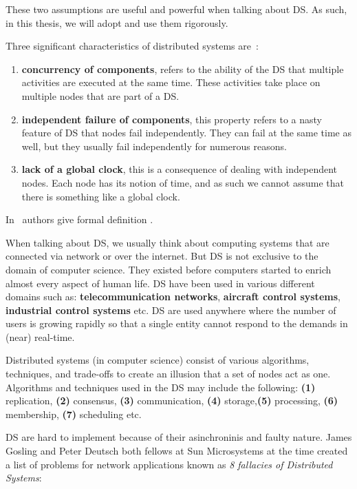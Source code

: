 \noindent
These two assumptions are useful and powerful when talking about DS. As such, in this thesis, we will adopt and use them rigorously.

Three significant characteristics of distributed systems are~\cite{0019513}: 

\begin{enumerate}[start=1,label={(\bfseries \arabic*)}]
	\item \textbf{concurrency of components}, refers to the ability of the DS that multiple activities are executed at the same time. These activities take place on multiple nodes that are part of a DS.
	\item \textbf{independent failure of components}, this property refers to a nasty feature of DS that nodes fail independently. They can fail at the same time as well, but they usually fail independently for numerous reasons.
	\item \textbf{lack of a global clock}, this is a consequence of dealing with independent nodes. Each node has its notion of time, and as such we cannot assume that there is something like a global clock.
\end{enumerate} 

\noindent
In~\cite{SteenT16} authors give formal definition .

When talking about DS, we usually think about computing systems that are connected via network or over the internet. But DS is not exclusive to the domain of computer science. They existed before computers started to enrich almost every aspect of human life. DS have been used in various different domains such as: \textbf{telecommunication networks}, \textbf{aircraft control systems}, \textbf{industrial control systems} etc. DS are used anywhere where the number of users is growing rapidly so that a single entity cannot respond to the demands in (near) real-time.

Distributed systems (in computer science) consist of various algorithms, techniques, and trade-offs to create an illusion that a set of nodes act as one. Algorithms and techniques used in the DS may include the following: \textbf{(1)} replication, \textbf{(2)} consensus, \textbf{(3)} communication, \textbf{(4)} storage,\textbf{(5)} processing, \textbf{(6)} membership, \textbf{(7)} scheduling etc.

DS are hard to implement because of their asinchroninis and faulty nature. James Gosling and Peter Deutsch both fellows at Sun Microsystems at the time created a list of problems for network applications known as \textit{8 fallacies of Distributed Systems}:\label{enum:fallacies}

